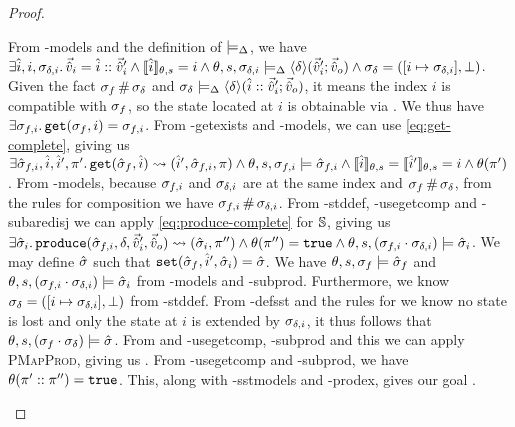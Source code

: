 \begin{proof}
\begin{hypvlist}
 From \hyp{models} and the definition of $\models_{\Delta}$, we have $\exists \hat{i},i,\sigma_{\delta,i} \ldotp \vec{\hat{v}}_i=\hat{i}::\vec{\hat{v}}_i' \land \llbracket\hat{i}\rrbracket_{\theta,s}=i \land \theta,s,\sigma_{\delta,i}\models_{\Delta} \left<\delta\right>\!(\vec{\hat{v}}_i';\vec{\hat{v}}_o) \land \sigma_\delta=([i\mapsto \sigma_{\delta,i}],\bot)$.
 Given the fact $\sigma_f\operatorname{\#}\sigma_\delta$ and $\sigma_\delta\models_{\Delta}\left<\delta\right>\!(\hat{i}::\vec{\hat{v}}_i';\vec{\hat{v}}_o)$, it means the index $i$ is compatible with $\sigma_f$, so the state located at $i$ is obtainable via . We thus have $\exists \sigma_{f,i} \ldotp {\ensuremath{\texttt{get}(\sigma_f,i)=\sigma_{f,i}}}$.
 From \hyp{getexists} and \hyp{models}, we can use \ref{eq:get-complete}, giving us $\exists \hat{\sigma}_{f,i},\hat{i},\hat{i}', \pi'\ldotp \texttt{get}(\hat{\sigma}_f,\hat{i})\rightsquigarrow(\hat{i}',\hat{\sigma}_{f,i},\pi) \land \theta,s,\sigma_{f,i}\models\hat{\sigma}_{f,i} \land \llbracket\hat{i}\rrbracket_{\theta,s}=\llbracket\hat{i}'\rrbracket_{\theta,s}=i \land \theta(\pi')$.
 From \hyp{models}, because $\sigma_{f,i}$ and $\sigma_{\delta,i}$ are at the same index and $\sigma_f\operatorname{\#}\sigma_\delta$, from the rules for composition we have $\sigma_{f,i}\operatorname{\#}\sigma_{\delta,i}$.
 From \hyp{stddef}, \hyp{usegetcomp} and \hyp{subaredisj} we can apply \ref{eq:produce-complete} for $\mathbb S$, giving us $\exists \hat{\sigma}_i\ldotp {\ensuremath{\texttt{produce}(\hat{\sigma}_{f,i},\delta,\vec{\hat{v}}_i',\vec{\hat{v}}_o)\rightsquigarrow (\hat{\sigma}_i,\pi'')}}\land\theta(\pi'')=\texttt{true}\land \theta,s,(\sigma_{f,i}\cdot\sigma_{\delta,i})\models\hat{\sigma}_i$.
 We may define $\hat{\sigma}$ such that $\texttt{set}(\hat{\sigma}_f,\hat{i}',\hat{\sigma}_i)=\hat{\sigma}$.
 We have $\theta, s, \sigma_f \models \hat{\sigma}_f$ and ${\theta,s,(\sigma_{f,i}\cdot\sigma_{\delta,i})\models\hat{\sigma}_i}$ from \hyp{models} and \hyp{subprod}. Furthermore, we know $\sigma_\delta=([i\mapsto \sigma_{\delta,i}],\bot)$ from \hyp{stddef}. From \hyp{defsst} and the rules for  we know no state is lost and only the state at $i$ is extended by $\sigma_{\delta,i}$, it thus follows that $\theta,s,(\sigma_f\cdot\sigma_\delta)\models\hat{\sigma}$.%
 From and \hyp{usegetcomp}, \hyp{subprod} and this we can apply \textsc{PMapProd}, giving us .
 From \hyp{usegetcomp} and \hyp{subprod}, we have $\theta(\pi'::\pi'')=\texttt{true}$. This, along with \hyp{sstmodels} and \hyp{prodex}, gives our goal .
\end{hypvlist}

\pfcase{$\delta = \domainset$}


\end{proof}
